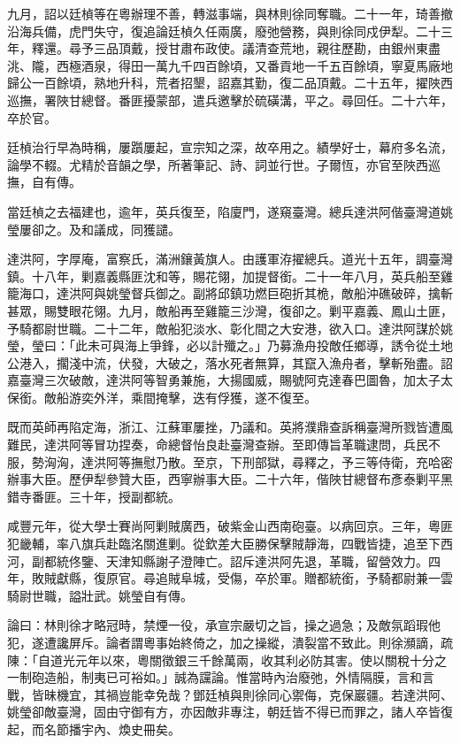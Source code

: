 \begin{pinyinscope}
九月，詔以廷楨等在粵辦理不善，轉滋事端，與林則徐同奪職。二十一年，琦善撤沿海兵備，虎門失守，復追論廷楨久任兩廣，廢弛營務，與則徐同戍伊犁。二十三年，釋還。尋予三品頂戴，授甘肅布政使。議清查荒地，親往歷勘，由銀州東盡洮、隴，西極酒泉，得田一萬九千四百餘頃，又番貢地一千五百餘頃，寧夏馬廠地歸公一百餘頃，熟地升科，荒者招墾，詔嘉其勤，復二品頂戴。二十五年，擢陜西巡撫，署陜甘總督。番匪擾蒙部，遣兵邀擊於硫磺溝，平之。尋回任。二十六年，卒於官。

廷楨治行早為時稱，屢躓屢起，宣宗知之深，故卒用之。績學好士，幕府多名流，論學不輟。尤精於音韻之學，所著筆記、詩、詞並行世。子爾恆，亦官至陜西巡撫，自有傳。

當廷楨之去福建也，逾年，英兵復至，陷廈門，遂窺臺灣。總兵達洪阿偕臺灣道姚瑩屢卻之。及和議成，同獲譴。

達洪阿，字厚庵，富察氏，滿洲鑲黃旗人。由護軍洊擢總兵。道光十五年，調臺灣鎮。十八年，剿嘉義縣匪沈和等，賜花翎，加提督銜。二十一年八月，英兵船至雞籠海口，達洪阿與姚瑩督兵御之。副將邱鎮功燃巨砲折其桅，敵船沖礁破碎，擒斬甚眾，賜雙眼花翎。九月，敵船再至雞籠三沙灣，復卻之。剿平嘉義、鳳山土匪，予騎都尉世職。二十二年，敵船犯淡水、彰化間之大安港，欲入口。達洪阿謀於姚瑩，瑩曰：「此未可與海上爭鋒，必以計殲之。」乃募漁舟投敵任鄉導，誘令從土地公港入，擱淺中流，伏發，大破之，落水死者無算，其竄入漁舟者，擊斬殆盡。詔嘉臺灣三次破敵，達洪阿等智勇兼施，大揚國威，賜號阿克達春巴圖魯，加太子太保銜。敵船游奕外洋，乘間掩擊，迭有俘獲，遂不復至。

既而英師再陷定海，浙江、江蘇軍屢挫，乃議和。英將濮鼎查訴稱臺灣所戮皆遭風難民，達洪阿等冒功捏奏，命總督怡良赴臺灣查辦。至即傳旨革職逮問，兵民不服，勢洶洶，達洪阿等撫慰乃散。至京，下刑部獄，尋釋之，予三等侍衛，充哈密辦事大臣。歷伊犁參贊大臣，西寧辦事大臣。二十六年，偕陜甘總督布彥泰剿平黑錯寺番匪。三十年，授副都統。

咸豐元年，從大學士賽尚阿剿賊廣西，破紫金山西南砲臺。以病回京。三年，粵匪犯畿輔，率八旗兵赴臨洺關進剿。從欽差大臣勝保擊賊靜海，四戰皆捷，追至下西河，副都統佟鑒、天津知縣謝子澄陣亡。詔斥達洪阿先退，革職，留營效力。四年，敗賊獻縣，復原官。尋追賊阜城，受傷，卒於軍。贈都統銜，予騎都尉兼一雲騎尉世職，謚壯武。姚瑩自有傳。

論曰：林則徐才略冠時，禁煙一役，承宣宗嚴切之旨，操之過急；及敵氛蹈瑕他犯，遂遭讒屏斥。論者謂粵事始終倚之，加之操縱，潰裂當不致此。則徐瀕謫，疏陳：「自道光元年以來，粵關徵銀三千餘萬兩，收其利必防其害。使以關稅十分之一制砲造船，制夷已可裕如。」誠為讜論。惟當時內治廢弛，外情隔膜，言和言戰，皆昧機宜，其禍豈能幸免哉？鄧廷楨與則徐同心禦侮，克保巖疆。若達洪阿、姚瑩卻敵臺灣，固由守御有方，亦因敵非專注，朝廷皆不得已而罪之，諸人卒皆復起，而名節播宇內、煥史冊矣。


\end{pinyinscope}
